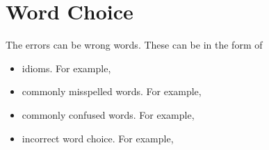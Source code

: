 \section{Word Choice}
The errors can be wrong words. These can be in the form of

\begin{itemize}
\item{idioms. For example,} \hrulefill
\item{commonly misspelled words. For example,} \hrulefill
\item{commonly confused words. For example,} \hrulefill
\item{incorrect word choice. For example,} \hrulefill
\end{itemize} 